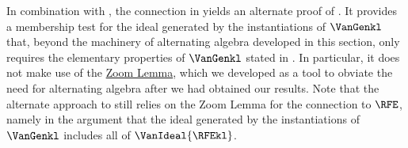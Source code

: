 \documentclass{toc}
\begin{document}
In combination with , the connection in  yields an alternate proof of . It provides a membership test for the ideal generated by the instantiations of $\VanGenkl$ that, beyond the machinery of alternating algebra developed in this section, only requires the elementary properties of $\VanGenkl$ stated in . In particular, it does not make use of the \hyperref[lem.multi-zsub-deriv]{Zoom Lemma}, which we developed as a tool to obviate the need for alternating algebra after we had obtained our results. Note that the alternate approach to  still relies on the Zoom Lemma for the connection to $\RFE$, namely in the argument that the ideal generated by the instantiations of $\VanGenkl$ includes all of $\VanIdeal{\RFEkl}$.
\end{document}

